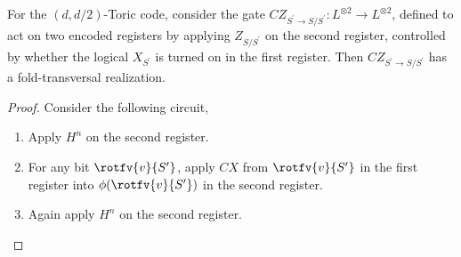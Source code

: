 

\begin{corollary}
For the $(d,d/2)$-Toric code, consider the gate $CZ_{S^{\prime}\rightarrow S/S^{\prime}} \colon L^{\otimes 2} \rightarrow L^{\otimes 2}$, defined to act on two encoded registers by applying $Z_{S/S^{\prime}}$ on the second register, controlled by whether the logical $X_{S^{\prime}}$ is turned on in the first register. Then $CZ_{S^{\prime}\rightarrow S/S^{\prime}}$  has a fold-transversal realization. 
\end{corollary}
\begin{proof}
Consider the following circuit, 
\begin{enumerate}
  \item Apply $H^{n}$ on the second register.  
  \item For any bit $\rotfv{v}{S^{\prime}}$, apply $CX$ from $\rotfv{v}{S^{\prime}}$ in the first register into $\phi(\rotfv{v}{S^{\prime}})$ in the second register.
  \item Again apply $H^{n}$ on the second register.  
\end{enumerate}
\end{proof}

